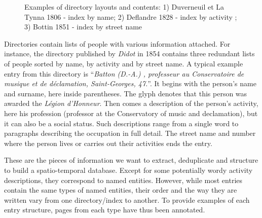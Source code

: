 \begin{figure}[htb!]
	  \caption{\label{fig:directories} Examples of directory layouts and contents: 1) Duverneuil et La Tynna 1806 - index by name; 2) Deflandre 1828 - index by activity ; 3) Bottin 1851 - index by street name}
\end{figure}


Directories contain lists of people with various information attached.
For instance, the directory published by \emph{Didot} in 1854 contains three redundant lists of people sorted by name, by activity and by street name.
A typical example entry from this directory is ``\textit{Batton (D.-A.) , professeur au Conservatoire de musique et de déclamation, Saint-Georges, 47.}''.
It begins with the person's name and surname, here inside parentheses.
The glyph denotes that this person was awarded the \textit{Légion d'Honneur}.
Then comes a description of the person's activity, here his profession (professor at the Conservatory of music and declamation), but it can also be a social status.
Such descriptions range from a single word to paragraphs describing the occupation in full detail.
The street name and number where the person lives or carries out their activities ends the entry.

These are the pieces of information we want to extract, deduplicate and structure to build a spatio-temporal database.
Except for some potentially wordy activity descriptions, they correspond to named entities. However, while most entries contain the same types of named entities, their order and the way they are written vary from one directory/index to another. To provide examples of each entry structure, pages from each type have thus been annotated. %


